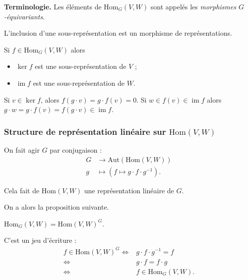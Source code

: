 \documentclass{../../notes}
\DeclareMathOperator{\im}{im}
\begin{document}
  \textbf{Terminologie.}
  Les éléments de $\mathrm{Hom}_G(V,W)$ sont appelés les \textit{morphismes $G$-équivariants}.

  \begin{exo}
    L'inclusion d'une sous-représentation est un morphisme de représentations.
  \end{exo}

  \begin{obs}
    Si $f \in \mathrm{Hom}_G(V,W)$ alors
    \begin{itemize}
      \item $\ker f$ est une sous-représentation de $V$ ;
      \item $\im f$ est une sous-représentation de $W$.
    \end{itemize}
  \end{obs}
  \begin{expl}
    Si $v \in \ker f$, alors $f(g \cdot v) = g \cdot f(v) = 0$.
    Si $w \in f(v) \in \im f$ alors $g \cdot w = g \cdot f(v) = f(g \cdot v) \in \im f$.
  \end{expl}

  \subsubsection{Structure de représentation linéaire sur $\mathrm{Hom}(V, W)$}

  On fait agir $G$ par conjugaison : \begin{align*}
    G &\longrightarrow \mathrm{Aut}(\mathrm{Hom}(V, W)) \\
    g &\longmapsto (f \mapsto g \cdot f \cdot g^{-1})
  .\end{align*}

  \begin{obs}
    Cela fait de $\mathrm{Hom}(V,W)$ une représentation linéaire de $G$.
  \end{obs}

  On a alors la proposition suivante.
  \begin{prop}
    $\mathrm{Hom}_G(V,W) = \mathrm{Hom}(V,W)^G$.
  \end{prop}
  \begin{prv}
    C'est un jeu d'écriture :
    \begin{align*}
      f \in \mathrm{Hom}(V,W)^G \iff& g \cdot f \cdot g^{-1} = f\\
      \iff& g \cdot f = f \cdot g\\
      \iff& f \in \mathrm{Hom}_G(V,W)
    .\end{align*}
  \end{prv}
\end{document}
